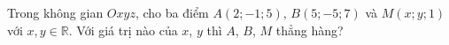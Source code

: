 \begin{ex}
Trong không gian $Oxyz$, cho ba điểm $A(2;-1;5)$, $B(5;-5;7)$ và $M(x;y;1)$ với $x,y\in\mathbb R$. Với giá trị nào của $x$, $y$ thì $A$, $B$, $M$ thẳng hàng?
\end{ex}
